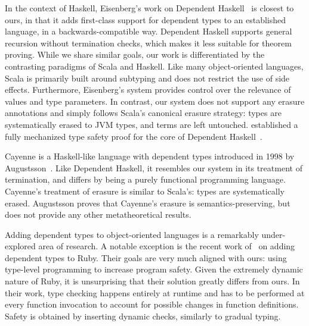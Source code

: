 In the context of Haskell, Eisenberg's work on Dependent Haskell~\citep{eisenberg2016dependent} is closest to ours, in that it adds first-class support for dependent types to an established language, in a backwards-compatible way.
Dependent Haskell supports general recursion without termination checks, which makes it less suitable for theorem proving.
While we share similar goals, our work is differentiated by the contrasting paradigms of Scala and Haskell.
Like many object-oriented languages, Scala is primarily built around subtyping and does not restrict the use of side effects.
Furthermore, Eisenberg's system provides control over the relevance of values and type parameters.
In contrast, our system does not support any erasure annotations and simply follows Scala's canonical erasure strategy: types are systematically erased to JVM types, and terms are left untouched.
\citeauthor{weirich2017a} established a fully mechanized type safety proof for the core of Dependent Haskell~\citep{weirich2017a}.

Cayenne is a Haskell-like language with dependent types introduced in 1998 by Augustsson~\citep{augustsson1998cayenne}.
Like Dependent Haskell, it resembles our system in its treatment of termination, and differs by being a purely functional programming language.
Cayenne's treatment of erasure is similar to Scala's: types are systematically erased.
Augustsson proves that Cayenne's erasure is semantics-preserving, but does not provide any other metatheoretical results.

Adding dependent types to object-oriented languages is a remarkably under-explored area of research.
A notable exception is the recent work of~\cite{kazerounian2019type} on adding dependent types to Ruby.
Their goals are very much aligned with ours: using type-level programming to increase program safety.
Given the extremely dynamic nature of Ruby, it is unsurprising that their solution greatly differs from ours.
In their work, type checking happens entirely at runtime and has to be performed at every function invocation to account for possible changes in function definitions.
Safety is obtained by inserting dynamic checks, similarly to gradual typing.
